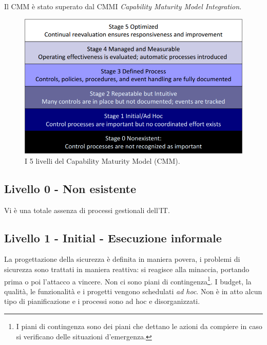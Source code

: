Il CMM è stato superato dal CMMI \textit{Capability Maturity Model Integration}.




\begin{figure}[h!]
        \begin{center}
                \includegraphics[scale=2.0]{res/img/maturity_level}
        \end{center}
        \caption{I 5 livelli del Capability Maturity Model (CMM).}
        \label{fig:cmm:levels}
\end{figure}




\subsection{Livello 0 - Non esistente}

Vi è una totale assenza
di processi gestionali dell'IT.

\subsection{Livello 1 - Initial - Esecuzione informale}

La progettazione della sicurezza è definita in maniera povera, i problemi di
sicurezza sono trattati in maniera reattiva: si reagisce
alla minaccia, portando prima o poi l'attacco a vincere. Non ci sono piani di
contingenza\footnote{I piani di contingenza sono dei piani che dettano le
azioni da compiere in caso si verificano delle situazioni d'emergenza.}. I
budget, la qualità, le funzionalità e i progetti vengono schedulati \textit{ad
hoc}. Non è in atto alcun tipo di
pianificazione e i processi sono ad hoc e disorganizzati.

